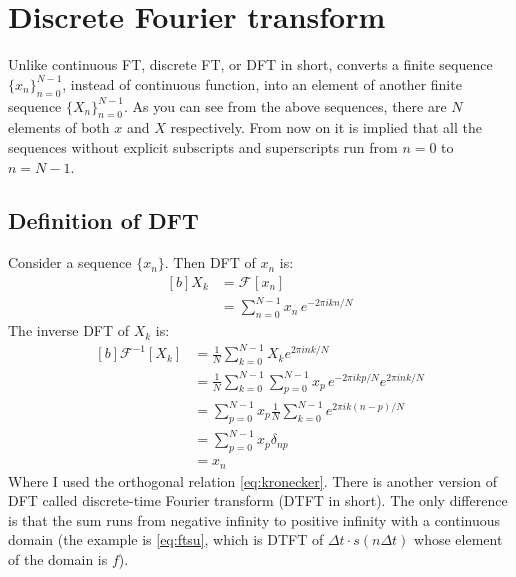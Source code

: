 \documentclass[letterpaper, 11pt]{article}
\newcommand{\fourier}[2]{\mathcal{F}_{#1}[#2]} %
\newcommand{\ifourier}[2]{\mathcal{F}_{#1}^{-1}[#2]} %
\newcommand{\ssum}[1]{\sum_{#1 = 0}^{N - 1}} %
\newcommand{\dft}[3]{\ssum{#1} #2 e^{-2\pi i#3#1/N}} %
\newcommand{\idft}[3]{\frac{1}{N}\ssum{#1} #2 e^{2\pi i#3#1/N}} %
\numberwithin{equation}{section}
\numberwithin{figure}{section}
\numberwithin{table}{section}
\begin{document}
\section{Discrete Fourier transform}
Unlike continuous FT, discrete FT, or DFT in short, converts a finite sequence \(\{x_{n}\}_{n=0}^{N-1} \), instead of continuous function, into an element of another finite sequence \( \{X_{n}\}_{n=0}^{N-1} \). As you can see from the above sequences, there are \(N\) elements of both \(x\) and \(X\) respectively. From now on it is implied that all the sequences without explicit subscripts and superscripts run from \(n=0\) to \(n=N-1\).   

\subsection{Definition of DFT}
Consider a sequence \(\{x_{n}\}\). Then DFT of \(x_{n}\) is:
\begin{equation}
	\begin{aligned}[b]
		X_{k}	&= \fourier{}{x_{n}}\\
			&= \dft{n}{x_{n}\,}{k}
	\end{aligned}
\end{equation}
The inverse DFT of \(X_{k}\) is:
\begin{equation}
	\begin{aligned}[b]
		\ifourier{}{X_{k}}
			&= \idft{k}{X_{k}}{n}\\
			&= \idft{k}{\dft{p}{x_{p}\,}{k}}{n}\\
			&= \ssum{p} x_{p} \frac{1}{N}\ssum{k} e^{2\pi ik(n-p)/N}\\
			&= \ssum{p} x_{p} \delta_{np}\\
			&= x_{n}
	\end{aligned}
\end{equation}
Where I used the orthogonal relation \eqref{eq:kronecker}\cite{james}. There is another version of DFT called discrete-time Fourier transform (DTFT in short). The only difference is that the sum runs from negative infinity to positive infinity with a continuous domain (the example is \eqref{eq:ftsu}, which is DTFT of \(\Delta t\cdot s(n\Delta t)\) whose element of the domain is \(f\)). 

\clearpage
\pagestyle{plain}
\printbibliography
{}
\printindex
\end{document}
